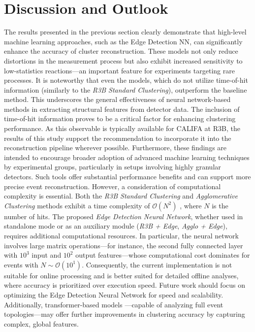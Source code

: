 \documentclass[final,5p,times,twocolumn]{elsarticle}
\begin{document}
\section{Discussion and Outlook}\label{sec:disc_outlook}

The results presented in the previous section clearly demonstrate that high-level machine learning approaches, such as the Edge Detection NN, can significantly enhance the accuracy of cluster reconstruction. These models not only reduce distortions in the measurement process but also exhibit increased sensitivity to low-statistics reactions—an important feature for experiments targeting rare processes.\newline
It is noteworthy that even the models, which do not utilize time-of-hit information (similarly to the \textit{R3B Standard Clustering}), outperform the baseline method. This underscores the general effectiveness of neural network-based methods in extracting structural features from detector data.\newline
The inclusion of time-of-hit information proves to be a critical factor for enhancing clustering performance. As this observable is typically available for CALIFA at R3B, the results of this study support the recommendation to incorporate it into the reconstruction pipeline wherever possible.\newline
Furthermore, these findings are intended to encourage broader adoption of advanced machine learning techniques by experimental groups, particularly in setups involving highly granular detectors. Such tools offer substantial performance benefits and can support more precise event reconstruction.\newline
However, a consideration of computational complexity is essential. Both the \textit{R3B Standard Clustering} and \textit{Agglomerative Clustering} methods exhibit a time complexity of $\mathcal{O}(N^2)$ \cite{sieranoja2025fast}, where $N$ is the number of hits. The proposed \textit{Edge Detection Neural Network}, whether used in standalone mode or as an auxiliary module (\textit{R3B + Edge}, \textit{Agglo + Edge}), requires additional computational resources. In particular, the neural network involves large matrix operations—for instance, the second fully connected layer with $10^3$ input and $10^2$ output features—whose computational cost dominates for events with $N \sim \mathcal{O}(10^1)$. Consequently, the current implementation is not suitable for online processing and is better suited for detailed offline analyses, where accuracy is prioritized over execution speed.\newline
Future work should focus on optimizing the Edge Detection Neural Network for speed and scalability. Additionally, transformer-based models \cite{vaswani2017attention}—capable of analyzing full event topologies—may offer further improvements in clustering accuracy by capturing complex, global features.
\end{document}
